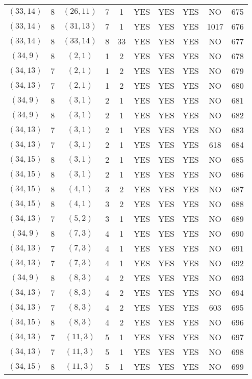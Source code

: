 \begin{longtable}{|c|c|c|c|c|c|c|c|c|c|}
$(33, 14)$ & 8 & $(26, 11)$ & 7 & 1 & YES & YES & YES & NO & 675\\
$(33, 14)$ & 8 & $(31, 13)$ & 7 & 1 & YES & YES & YES & 1017 & 676\\
$(33, 14)$ & 8 & $(33, 14)$ & 8 & 33 & YES & YES & YES & NO & 677\\
$(34, 9)$ & 8 & $(2, 1)$ & 1 & 2 & YES & YES & YES & NO & 678\\
$(34, 13)$ & 7 & $(2, 1)$ & 1 & 2 & YES & YES & YES & NO & 679\\
$(34, 13)$ & 7 & $(2, 1)$ & 1 & 2 & YES & YES & YES & NO & 680\\
$(34, 9)$ & 8 & $(3, 1)$ & 2 & 1 & YES & YES & YES & NO & 681\\
$(34, 9)$ & 8 & $(3, 1)$ & 2 & 1 & YES & YES & YES & NO & 682\\
$(34, 13)$ & 7 & $(3, 1)$ & 2 & 1 & YES & YES & YES & NO & 683\\
$(34, 13)$ & 7 & $(3, 1)$ & 2 & 1 & YES & YES & YES & 618 & 684\\
$(34, 15)$ & 8 & $(3, 1)$ & 2 & 1 & YES & YES & YES & NO & 685\\
$(34, 15)$ & 8 & $(3, 1)$ & 2 & 1 & YES & YES & YES & NO & 686\\
$(34, 15)$ & 8 & $(4, 1)$ & 3 & 2 & YES & YES & YES & NO & 687\\
$(34, 15)$ & 8 & $(4, 1)$ & 3 & 2 & YES & YES & YES & NO & 688\\
$(34, 13)$ & 7 & $(5, 2)$ & 3 & 1 & YES & YES & YES & NO & 689\\
$(34, 9)$ & 8 & $(7, 3)$ & 4 & 1 & YES & YES & YES & NO & 690\\
$(34, 13)$ & 7 & $(7, 3)$ & 4 & 1 & YES & YES & YES & NO & 691\\
$(34, 13)$ & 7 & $(7, 3)$ & 4 & 1 & YES & YES & YES & NO & 692\\
$(34, 9)$ & 8 & $(8, 3)$ & 4 & 2 & YES & YES & YES & NO & 693\\
$(34, 13)$ & 7 & $(8, 3)$ & 4 & 2 & YES & YES & YES & NO & 694\\
$(34, 13)$ & 7 & $(8, 3)$ & 4 & 2 & YES & YES & YES & 603 & 695\\
$(34, 15)$ & 8 & $(8, 3)$ & 4 & 2 & YES & YES & YES & NO & 696\\
$(34, 13)$ & 7 & $(11, 3)$ & 5 & 1 & YES & YES & YES & NO & 697\\
$(34, 13)$ & 7 & $(11, 3)$ & 5 & 1 & YES & YES & YES & NO & 698\\
$(34, 15)$ & 8 & $(11, 3)$ & 5 & 1 & YES & YES & YES & NO & 699\\

\end{longtable}
